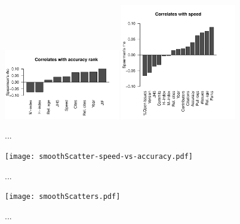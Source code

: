 \documentclass[fleqn,10pt]{SelfArx} %
\begin{document}
\begin{figure}[H]
\centering
\includegraphics[width=0.45\textwidth]{spearmanBarplot.pdf}
\includegraphics[width=0.45\textwidth]{spearmanBarplotSpeed.pdf}
\caption{...}
\label{fig:S2}
\end{figure}


\begin{figure}[H]
\centering
\texttt{[image: smoothScatter-speed-vs-accuracy.pdf]}
\caption{...}
\label{fig:S2}
\end{figure}

\begin{figure}[H]
\centering
\texttt{[image: smoothScatters.pdf]}
\caption{...}
\label{fig:S3}
\end{figure}
\end{document}
